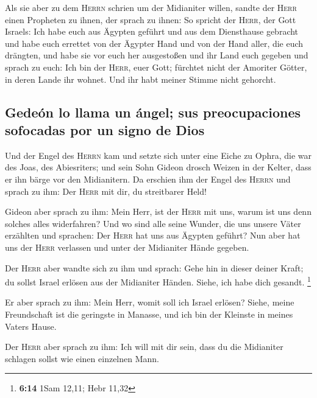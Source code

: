  Als sie aber zu dem \textsc{Herrn} schrien um der
Midianiter willen,  sandte der \textsc{Herr} einen
Propheten zu ihnen, der sprach zu ihnen: So spricht der \textsc{Herr},
der Gott Israels: Ich habe euch aus Ägypten geführt und aus dem
Diensthause gebracht  und habe euch errettet von der
Ägypter Hand und von der Hand aller, die euch drängten, und habe sie vor
euch her ausgestoßen und ihr Land euch gegeben  und
sprach zu euch: Ich bin der \textsc{Herr}, euer Gott; fürchtet nicht der
Amoriter Götter, in deren Lande ihr wohnet. Und ihr habt meiner Stimme
nicht gehorcht.

\hypertarget{gedeuxf3n-lo-llama-un-uxe1ngel-sus-preocupaciones-sofocadas-por-un-signo-de-dios}{%
\subsection{Gedeón lo llama un ángel; sus preocupaciones sofocadas por
un signo de
Dios}\label{gedeuxf3n-lo-llama-un-uxe1ngel-sus-preocupaciones-sofocadas-por-un-signo-de-dios}}

 Und der Engel des \textsc{Herrn} kam und setzte sich
unter eine Eiche zu Ophra, die war des Joas, des Abiesriters; und sein
Sohn Gideon drosch Weizen in der Kelter, dass er ihn bärge vor den
Midianitern.  Da erschien ihm der Engel des
\textsc{Herrn} und sprach zu ihm: Der \textsc{Herr} mit dir, du
streitbarer Held!

 Gideon aber sprach zu ihm: Mein Herr, ist der
\textsc{Herr} mit uns, warum ist uns denn solches alles widerfahren? Und
wo sind alle seine Wunder, die uns unsere Väter erzählten und sprachen:
Der \textsc{Herr} hat uns aus Ägypten geführt? Nun aber hat uns der
\textsc{Herr} verlassen und unter der Midianiter Hände gegeben.

 Der \textsc{Herr} aber wandte sich zu ihm und sprach:
Gehe hin in dieser deiner Kraft; du sollst Israel erlösen aus der
Midianiter Händen. Siehe, ich habe dich gesandt. \footnote{\textbf{6:14}
  1Sam 12,11; Hebr 11,32}

 Er aber sprach zu ihm: Mein Herr, womit soll ich Israel
erlösen? Siehe, meine Freundschaft ist die geringste in Manasse, und ich
bin der Kleinste in meines Vaters Hause.

 Der \textsc{Herr} aber sprach zu ihm: Ich will mit dir
sein, dass du die Midianiter schlagen sollst wie einen einzelnen Mann.

